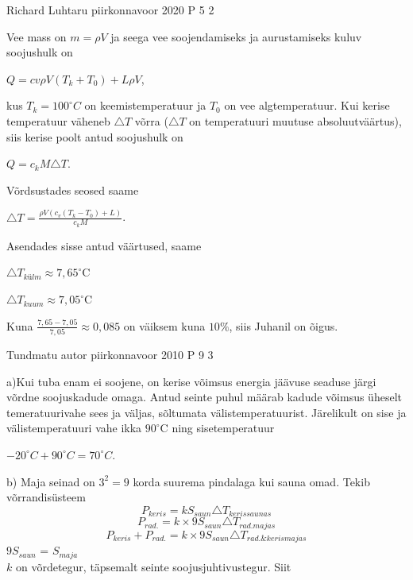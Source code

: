 \documentclass[11pt]{article}
\begin{document}
{%
{Richard Luhtaru} %
{piirkonnavoor} %
{2020} %
{P 5} %
{2} %
{

\ifSolution
Vee mass on $m = \rho V$ ja seega vee soojendamiseks ja aurustamiseks kuluv soojushulk on
\begin{center}
$ Q = cv \rho V (T_k + T_0) + L \rho V$,
\end{center}
kus $T_k = 100^{\circ}C$ on keemistemperatuur ja $T_0$ on vee algtemperatuur. Kui kerise temperatuur väheneb $\triangle T$ võrra ($\triangle T$ on temperatuuri muutuse absoluutväärtus), siis kerise poolt antud soojushulk on
\begin{center}
$Q = c_k M \triangle T$.
\end{center}
Võrdsustades seosed saame
\begin{center}
$\triangle T = \frac{\rho V (c_v (T_k - T_0) + L)}{c_k M}$.
\end{center}
Asendades sisse antud väärtused, saame 
\begin{center}
$\triangle T_{külm} \approx 7,65 ^{\circ}$C
\end{center}
\begin{center}
$\triangle T_{kuum} \approx 7,05 ^{\circ}$C
\end{center}
Kuna $\frac{7,65 - 7,05}{7,05} \approx 0,085$ on väiksem kuna $10\%$, siis Juhanil on õigus.
\fi
}

{Tundmatu autor} %
{piirkonnavoor} %
{2010} %
{P 9} %
{3} %
{

\ifSolution
a)Kui tuba enam ei soojene, on kerise võimsus energia jäävuse seaduse järgi võrdne soojuskadude omaga. Antud seinte puhul määrab kadude võimsus üheselt temeratuurivahe sees ja väljas, sõltumata välistemperatuurist. Järelikult on sise ja välistemperatuuri vahe ikka $90^{\circ}$C ning sisetemperatuur
\begin{center}
$-20^{\circ}C + 90^{\circ}C = 70^{\circ}C$.
\end{center}
b) Maja seinad on $3^2 = 9$ korda suurema pindalaga kui sauna omad. Tekib võrrandisüsteem
\[
{P_{keris} = kS_{saun} \triangle T_{keris saunas}}
\]
\[
P_{rad.} = k \times 9S_{saun} \triangle T_{rad .majas}
\]
\[
P_{keris} + P_{rad.} = k \times 9S_{saun} \triangle T_{rad. \& keris majas}
\]
$9S_{saun}$ = $S_{maja}$
\\
$k$ on võrdetegur, täpsemalt seinte soojusjuhtivustegur. Siit \\

}}
\end{document}
